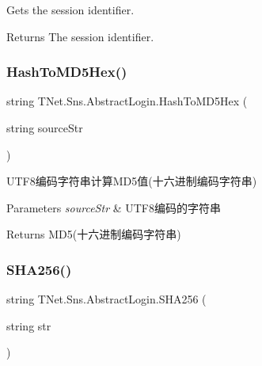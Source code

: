 Gets the session identifier. 

\begin{DoxyReturn}{Returns}
The session identifier.
\end{DoxyReturn}
\mbox{\label{class_t_net_1_1_sns_1_1_abstract_login_a6d39f88db81a7b1d7c1c037e66d61df2}} 
\subsubsection{\texorpdfstring{Hash\+To\+M\+D5\+Hex()}{HashToMD5Hex()}}
{\footnotesize\ttfamily string T\+Net.\+Sns.\+Abstract\+Login.\+Hash\+To\+M\+D5\+Hex (\begin{DoxyParamCaption}\item[{string}]{source\+Str }\end{DoxyParamCaption})\hspace{0.3cm}{\ttfamily [protected]}}



U\+T\+F8编码字符串计算\+M\+D5值(十六进制编码字符串) 


\begin{DoxyParams}{Parameters}
{\em source\+Str} & U\+T\+F8编码的字符串\\
\hline
\end{DoxyParams}
\begin{DoxyReturn}{Returns}
M\+D5(十六进制编码字符串)
\end{DoxyReturn}
\mbox{\label{class_t_net_1_1_sns_1_1_abstract_login_af9da7affc6d7191fb81cc639182dfc6d}} 
\subsubsection{\texorpdfstring{S\+H\+A256()}{SHA256()}}
{\footnotesize\ttfamily string T\+Net.\+Sns.\+Abstract\+Login.\+S\+H\+A256 (\begin{DoxyParamCaption}\item[{string}]{str }\end{DoxyParamCaption})\hspace{0.3cm}{\ttfamily [protected]}}



